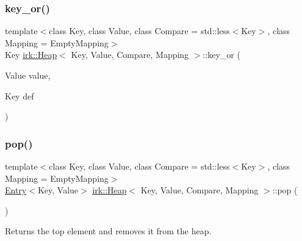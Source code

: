 \mbox{\label{classirk_1_1Heap_ae816d710ad7e5f482f492956156cf586}} 
\subsubsection{\texorpdfstring{key\+\_\+or()}{key\_or()}}
{\footnotesize\ttfamily template$<$class Key, class Value, class Compare = std\+::less$<$\+Key$>$, class Mapping = Empty\+Mapping$>$ \\
Key \mbox{\hyperlink{classirk_1_1Heap}{irk\+::\+Heap}}$<$ Key, Value, Compare, Mapping $>$\+::key\+\_\+or (\begin{DoxyParamCaption}\item[{Value}]{value,  }\item[{Key}]{def }\end{DoxyParamCaption})\hspace{0.3cm}{\ttfamily [inline]}}

\mbox{\label{classirk_1_1Heap_ad4ca0d2503acd1748bb22e19a1be663e}} 
\subsubsection{\texorpdfstring{pop()}{pop()}}
{\footnotesize\ttfamily template$<$class Key, class Value, class Compare = std\+::less$<$\+Key$>$, class Mapping = Empty\+Mapping$>$ \\
\mbox{\hyperlink{structirk_1_1Entry}{Entry}}$<$Key, Value$>$ \mbox{\hyperlink{classirk_1_1Heap}{irk\+::\+Heap}}$<$ Key, Value, Compare, Mapping $>$\+::pop (\begin{DoxyParamCaption}{ }\end{DoxyParamCaption})\hspace{0.3cm}{\ttfamily [inline]}}



Returns the top element and removes it from the heap. 

\mbox{\label{classirk_1_1Heap_abea088d8e2a513c571534eaf69ca7b84}} 
